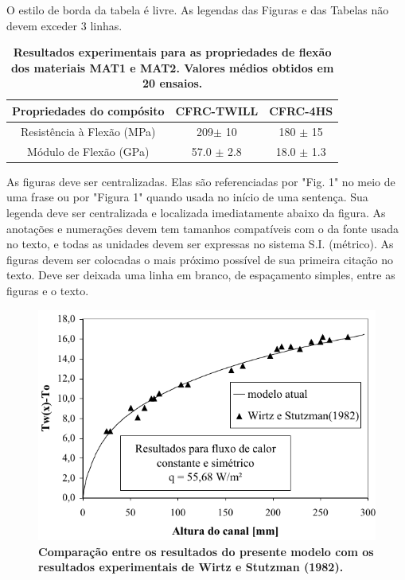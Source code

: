 \documentclass[10pt,fleqn,a4paper]{article}
\begin{document}
        O estilo de borda da tabela é livre. As legendas das Figuras e das Tabelas não devem exceder 3 linhas.

        \begin{table}[ht]
            \begin{center}
                \caption{\textbf{Resultados experimentais para as propriedades de flexão dos materiais MAT1 e MAT2. Valores médios obtidos em 20 ensaios.}}
                    \begin{tabular}{|c|c|c|}
                    \hline
                    Propriedades do compósito       & CFRC-TWILL        & CFRC-4HS         \\
                    \hline
                    Resistência à Flexão  (MPa)     & 209$\pm$ 10       & 180 $\pm$  15    \\
                    \hline
                    Módulo de Flexão  (GPa)         & 57.0 $\pm$ 2.8    & 18.0 $\pm$  1.3  \\
                    \hline
                    \end{tabular}
            \end{center}
        \end{table}

        As figuras deve ser centralizadas. Elas são referenciadas por "Fig. 1" no meio de uma frase ou por "Figura 1" quando usada no início de uma sentença. Sua legenda deve ser centralizada e localizada imediatamente abaixo da figura. As anotações e numerações devem tem tamanhos compatíveis com o da fonte usada no texto, e todas as unidades devem ser expressas no sistema S.I. (métrico). As figuras devem ser colocadas o mais próximo possível de sua primeira citação no texto. Deve ser deixada uma linha em branco, de espaçamento simples, entre as figuras e o texto.
    
        \begin{figure}[h]
            \begin{center}
                \includegraphics[angle=0, scale=.8]{figura.pdf}
            \end{center}
            \caption{\textbf{Comparação entre os resultados do presente modelo com os resultados experimentais de Wirtz e Stutzman (1982).}}
        \end{figure}
\end{document}
